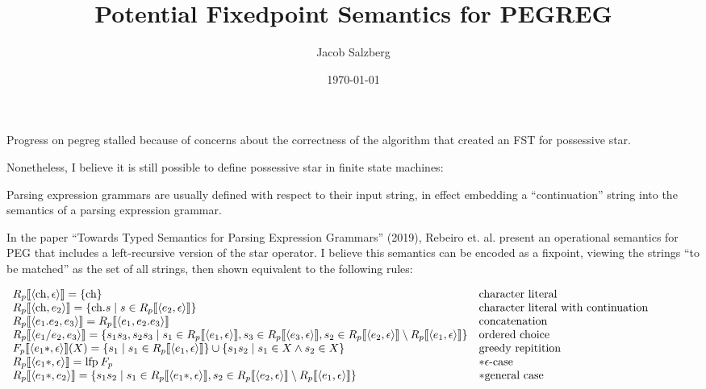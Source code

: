 \documentclass[10pt]{article}
\author {Jacob Salzberg}
\date{\today}
\title{Potential Fixedpoint Semantics for PEGREG}
\newcommand{\lfp}{{\kern-0.20em}\mathbin{\mbox{lfp}}}
\begin{document}
\maketitle

Progress on pegreg stalled because of concerns about the correctness of the algorithm that created an FST for possessive star.

Nonetheless, I believe it is still possible to define possessive star in finite state machines:

Parsing expression grammars are usually defined with respect to their input string, in effect embedding a ``continuation'' string into the semantics of a parsing expression grammar.

In the paper ``Towards Typed Semantics for Parsing Expression Grammars'' (2019), Rebeiro et. al. present an operational semantics for PEG that includes a left-recursive version of the
star operator. I believe this semantics can be encoded as a fixpoint, viewing the strings ``to be matched'' as the set of all strings, then shown equivalent to the following rules:

\begin{center}
$
  \begin{array}{l l}
    R_p \llbracket \langle \mbox{ch}, \epsilon \rangle \rrbracket = \{ \mbox{ch} \} & \mbox{character literal} \\
    R_p \llbracket \langle \mbox{ch}, e_2 \rangle \rrbracket = \{ \mbox{ch}.s \mid s \in R_p \llbracket \langle e_2, \epsilon \rangle \rrbracket \} & \mbox{character literal with continuation} \\
    R_p \llbracket \langle e_1.e_2, e_3 \rangle \rrbracket = R_p \llbracket \langle e_1, e_2.e_3 \rangle \rrbracket & \mbox{concatenation} \\
    R_p \llbracket \langle e_1/e_2, e_3 \rangle \rrbracket = \{ s_1s_3, s_2s_3 \mid s_1 \in R_p \llbracket \langle e_1, \epsilon \rangle \rrbracket, s_3 \in R_p \llbracket \langle e_3, \epsilon \rangle \rrbracket, s_2 \in R_p \llbracket \langle e_2, \epsilon \rangle \rrbracket \setminus R_p \llbracket \langle e_1, \epsilon \rangle \rrbracket \} & \mbox{ordered choice} \\
    F_p \llbracket \langle e_1\ast, \epsilon \rangle \rrbracket(X) = \{s_1 \mid s_1 \in R_p \llbracket \langle e_1, \epsilon \rangle \rrbracket \} \cup \{s_1s_2 \mid s_1 \in X \land s_2 \in X \} & \mbox{greedy repitition} \\
    R_p \llbracket \langle e_1\ast, \epsilon\rangle \rrbracket = \lfp F_p & \ast \epsilon\mbox{-case} \\
    R_p \llbracket \langle e_1\ast, e_2 \rangle \rrbracket = \{s_1s_2 \mid s_1 \in R_p \llbracket \langle e_1\ast, \epsilon \rangle \rrbracket, s_2 \in R_p \llbracket \langle e_2, \epsilon \rangle \rrbracket \setminus R_p \llbracket \langle e_1, \epsilon \rangle \rrbracket \} & \ast \mbox{general case} \\
  \end{array}
$
\end{center}
\end{document}
